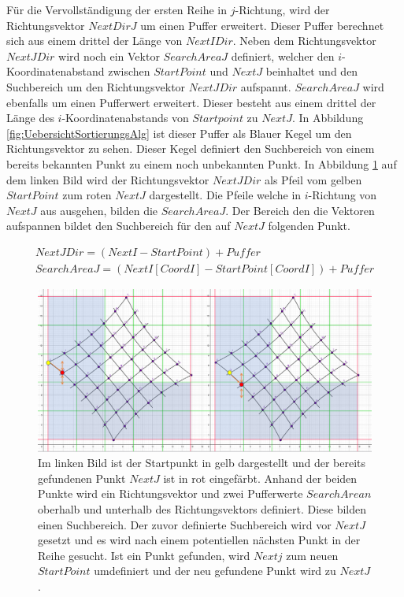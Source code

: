 Für die Vervollständigung der ersten Reihe in $j$-Richtung, wird der Richtungsvektor $NextDirJ$ um einen Puffer erweitert. Dieser Puffer berechnet sich aus einem drittel der Länge von $NextIDir$. Neben dem Richtungsvektor $NextJDir$ wird noch ein Vektor $SearchAreaJ$ definiert, welcher den $i$-Koordinatenabstand zwischen $StartPoint$ und $NextJ$ beinhaltet und den Suchbereich um den Richtungsvektor $NextJDir$ aufspannt. $SearchAreaJ$ wird ebenfalls um einen Pufferwert erweitert. Dieser besteht aus einem drittel der Länge des $i$-Koordinatenabstands von $Startpoint$ zu $NextJ$. In Abbildung \ref{fig:UebersichtSortierungsAlg} ist dieser Puffer als Blauer Kegel um den Richtungsvektor zu sehen. Dieser Kegel definiert den Suchbereich von einem bereits bekannten Punkt zu einem noch unbekannten Punkt. In Abbildung \ref{fig:IListJList} auf dem linken Bild wird der Richtungsvektor $NextJDir$ als Pfeil vom gelben $StartPoint$ zum roten $NextJ$ dargestellt. Die Pfeile welche in $i$-Richtung von $NextJ$ aus ausgehen, bilden die $SearchAreaJ$. Der Bereich den die Vektoren aufspannen bildet den Suchbereich für den auf $NextJ$ folgenden Punkt.

\begin{gather*}
	NextJDir = (NextI - StartPoint) + Puffer\\
	SearchAreaJ = (NextI[CoordI]-StartPoint[CoordI]) + Puffer
\end{gather*}


\begin{figure}[!htb]
	\centering
	\includegraphics[width=0.8\linewidth]{images/VerzeichnetesSchachbrett_4.png}
	\caption[Suche nach $NextJ$]{Im linken Bild ist der Startpunkt in gelb dargestellt und der bereits gefundenen Punkt $NextJ$ ist in rot eingefärbt. Anhand der beiden Punkte wird ein Richtungsvektor  und zwei Pufferwerte $SearchArean$ oberhalb und unterhalb des Richtungsvektors definiert. Diese bilden einen Suchbereich. Der zuvor definierte Suchbereich wird vor $NextJ$ gesetzt und es wird nach einem potentiellen nächsten Punkt in der Reihe gesucht. Ist ein Punkt gefunden, wird $Nextj$ zum neuen $StartPoint$ umdefiniert und der neu gefundene Punkt wird zu $NextJ$.}
	\label{fig:IListJList}
\end{figure}
\pagebreak

